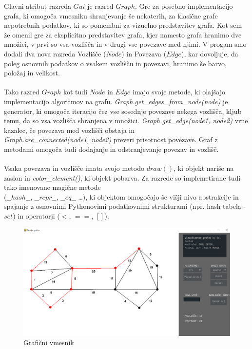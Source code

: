\documentclass[11pt]{article}
\begin{document}
Glavni atribut razreda $Gui$ je razred $Graph$. Gre za posebno implementacijo grafa, ki omogoča vmesniku shranjevanje še nekaterih, za klasične grafe nepotrebnih podatkov, ki so pomembni za vizuelno predstavitev grafa. Kot sem že omenil gre za eksplicitno predstavitev grafa, kjer namesto grafa hranimo dve množici, v prvi so vsa vozlišča in v drugi vse povezave med njimi. V progam smo dodali dva nova razreda Vozlišče ($Node$) in Povezava ($Edge$), kar dovoljuje, da poleg osnovnih podatkov o vsakem vozlišču in povezavi, hranimo še barvo, položaj in velikost.
\\ \\
Tako razred $Graph$ kot tudi $Node$ in $Edge$ imajo svoje metode, ki olajšajo implementacijo algoritmov na grafu. \textit{Graph.get\_edges\_from\_node(node)} je generator, ki omogoča iteracijo čez vse sosednje povezave nekega vozlišča, kljub temu, da so vsa vozlišča shranjena v množici. \textit{Graph.get\_edge(node1, node2)} vrne kazalec, če povezava med vozlišči obstaja in \\ \textit{Graph.are\_connected(node1, node2)} preveri prisotnost povezave. Graf z metodami omogoča tudi dodajanje in odstranjevanje povezav in vozlišč.
\\ \\
Vsaka povezava in vozlišče imata svojo metodo $draw()$, ki objekt nariše na zaslon in \textit{color\_element()}, ki objekt pobarva. Za razrede so implemetirane tudi tako imenovane magične metode \\ ($\_\_hash\_\_$, $\_\_repr\_\_$, $\_\_eq\_\_$ \dots), ki objektom omogočajo še višji nivo abstrakcije in spajanje z osnovnimi Pythonovimi podatkovnimi strukturami (npr. hash tabela - $set$) in operatorji ($<$, $==$, $[]$).

\begin{figure}[H]
    \centering
    \includegraphics[width=1\textwidth]{gui_example.png}
    \caption{Grafični vmesnik}
    \label{fig:mesh1}
\end{figure}
\end{document}
